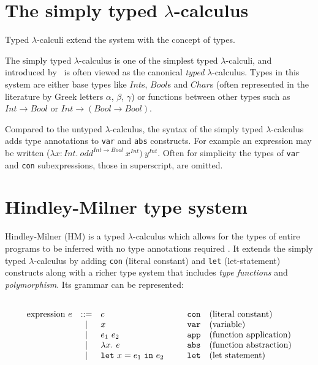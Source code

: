 \documentclass[a4paper,fleqn,oneside,12pt]{report}
\begin{document}
\section{The simply typed \texorpdfstring{$\lambda$-}{lambda }calculus}\label{id:h.w7vj0r89b86n}

Typed $\lambda$-calculi extend the system with the concept of types.

The simply typed $\lambda$-calculus is one of the simplest typed $\lambda$-calculi, and introduced by~\cite{ref11} is often viewed as the canonical \textit{typed} $\lambda$-calculus. Types in this system are either base types like $Int$s, $Bool$s and $Char$s (often represented in the literature by Greek letters $\alpha$, $\beta$, $\gamma$) or functions between other types such as $Int \rightarrow Bool$ or $Int \rightarrow (Bool \rightarrow Bool)$.

Compared to the untyped $\lambda$-calculus, the syntax of the simply typed $\lambda$-calculus adds type annotations to \texttt{var} and \texttt{abs} constructs. For example an expression may be written ($\lambda x: Int.\ odd^{Int \rightarrow Bool}\ x^{Int})\ y^{Int}$. Often for simplicity the types of \texttt{var} and \texttt{con} subexpressions, those in superscript, are omitted.

\section{Hindley-Milner type system}\label{id:h.gsouq2axz3k}

Hindley-Milner (HM) is a typed $\lambda$-calculus which allows for the types of entire programs to be inferred with no type annotations required \citep{ref12,ref13}. It extends the simply typed $\lambda$-calculus by adding \texttt{con} (literal constant) and \texttt{let} (let-statement) constructs along with a richer type system that includes \textit{type functions} and \textit{polymorphism}. Its grammar can be represented:

$$\begin{array}{lcllll}
  \\
    \textrm{expression}\ e & ::= & c                       & \hspace{0.25cm} & \mathtt{con} & \textrm{(literal constant)}\\
                         & \vert & x                                       & & \mathtt{var} & \textrm{(variable)}\\
                         & \vert & e_1\ e_2                                & & \mathtt{app} & \textrm{(function application)}\\
                         & \vert & \lambda x.\ e                           & & \mathtt{abs} & \textrm{(function abstraction)} \\
                         & \vert & \mathtt{let}\ x = e_1\ \mathtt{in}\ e_2 & & \mathtt{let} & \textrm{(let statement)}\\
  \\
\end{array}$$
\end{document}
